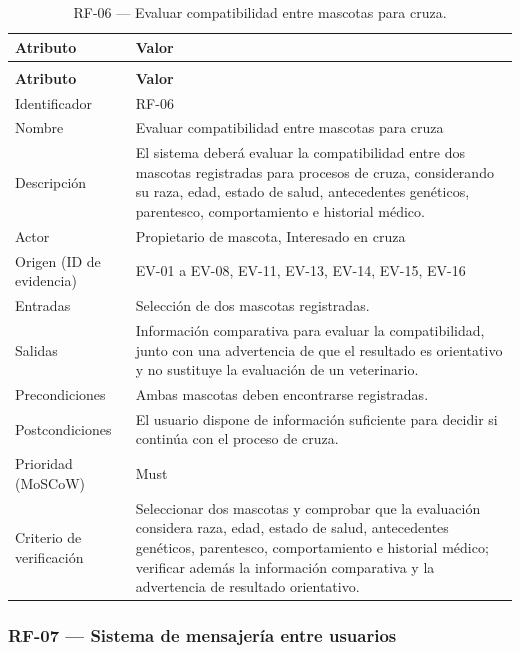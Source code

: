 \documentclass[journal,onecolumn]{IEEEtran}
\makeatletter
\newenvironment{atributos}[2]{%
	\small
	\begin{longtable}{@{}>{\raggedright\arraybackslash}p{4.2cm} >{\raggedright\arraybackslash}p{11.2cm}@{}}
		\caption{#2}\label{tab:#1}\\
		\toprule
		\textbf{Atributo} & \textbf{Valor} \\
		\midrule
		\endfirsthead
		\multicolumn{2}{@{}l}{\small\itshape (continuación)}\\
		\toprule
		\textbf{Atributo} & \textbf{Valor} \\
		\midrule
		\endhead
		\bottomrule
		\endlastfoot
	}{%
	\end{longtable}
	\normalsize
}
\makeatother
\begin{document}
	\begin{atributos}{RF-06}{RF-06 --- Evaluar compatibilidad entre mascotas para cruza.}
		Identificador & RF-06 \\
		Nombre & Evaluar compatibilidad entre mascotas para cruza \\
		Descripción & El sistema deberá evaluar la compatibilidad entre dos mascotas registradas para procesos de cruza, considerando su raza, edad, estado de salud, antecedentes genéticos, parentesco, comportamiento e historial médico. \\
		Actor & Propietario de mascota, Interesado en cruza \\
		Origen (ID de evidencia) & EV-01 a EV-08, EV-11, EV-13, EV-14, EV-15, EV-16 \\
		Entradas & Selección de dos mascotas registradas. \\
		Salidas & Información comparativa para evaluar la compatibilidad, junto con una advertencia de que el resultado es orientativo y no sustituye la evaluación de un veterinario. \\
		Precondiciones & Ambas mascotas deben encontrarse registradas. \\
		Postcondiciones & El usuario dispone de información suficiente para decidir si continúa con el proceso de cruza. \\
		Prioridad (MoSCoW) & Must \\
		Criterio de verificación & Seleccionar dos mascotas y comprobar que la evaluación considera raza, edad, estado de salud, antecedentes genéticos, parentesco, comportamiento e historial médico; verificar además la información comparativa y la advertencia de resultado orientativo. \\
	\end{atributos}
	
	\subsubsection{RF-07 --- Sistema de mensajería entre usuarios}
	
\end{document}
